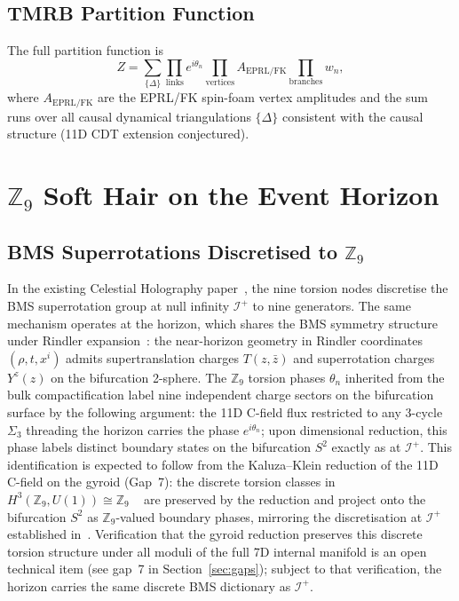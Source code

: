 \documentclass[11pt,a4paper]{article}
\begin{document}
\subsection{TMRB Partition Function}

The full partition function is
\begin{equation}
  Z = \sum_{\{\Delta\}} \prod_{\mathrm{links}} e^{i\theta_n}
      \prod_{\mathrm{vertices}} A_{\mathrm{EPRL/FK}}
      \prod_{\mathrm{branches}} w_n,
  \label{eq:Z}
\end{equation}
where $A_{\mathrm{EPRL/FK}}$ are the EPRL/FK spin-foam vertex amplitudes and the
sum runs over all causal dynamical triangulations $\{\Delta\}$ consistent with the
causal structure (11D CDT extension conjectured).

\section{$\mathbb{Z}_9$ Soft Hair on the Event Horizon}
\label{sec:hair}

\subsection{BMS Superrotations Discretised to $\mathbb{Z}_9$}

In the existing Celestial Holography paper~\cite{BresslerCH2026}, the nine torsion
nodes discretise the BMS superrotation group at null infinity $\mathscr{I}^+$ to
nine generators.  The same mechanism operates at the horizon, which shares the
BMS symmetry structure under Rindler expansion~\cite{Donnay2016}: the near-horizon
geometry in Rindler coordinates $(\rho, t, x^i)$ admits supertranslation charges
$T(z,\bar{z})$ and superrotation charges $Y^z(z)$ on the bifurcation 2-sphere.
The $\mathbb{Z}_9$ torsion phases $\theta_n$ inherited from the bulk
compactification label nine independent charge sectors on the bifurcation surface
by the following argument: the 11D C-field flux restricted to any 3-cycle
$\Sigma_3$ threading the horizon carries the phase $e^{i\theta_n}$; upon
dimensional reduction, this phase labels distinct boundary states on the
bifurcation $S^2$ exactly as at $\mathscr{I}^+$.  This identification is expected to follow
from the Kaluza--Klein reduction of the 11D C-field on the gyroid (Gap~7):
the discrete torsion classes in $H^3(\mathbb{Z}_9, U(1)) \cong \mathbb{Z}_9$
~\cite{DijkgraafWitten1990} are preserved by the reduction and project
onto the bifurcation $S^2$ as $\mathbb{Z}_9$-valued boundary phases, mirroring
the discretisation at $\mathscr{I}^+$ established in~\cite{BresslerCH2026}.
Verification that the gyroid reduction preserves this discrete torsion
structure under all moduli of the full 7D internal manifold is an open
technical item (see gap~7 in Section~\ref{sec:gaps}); subject to that
verification, the horizon carries the same discrete BMS dictionary as
$\mathscr{I}^+$.
\end{document}
